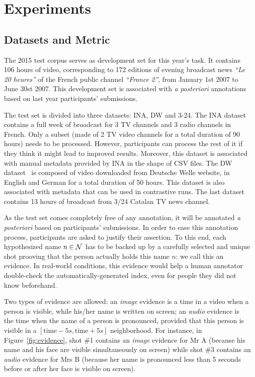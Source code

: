 \section{Experiments}
\label{sec:experiment}
%
\subsection{Datasets and Metric}

The 2015 test corpus serves as development set for this year's task. It contains 106 hours of video, corresponding to 172 editions of evening broadcast news \emph{``Le 20 heures''} of the French public channel \emph{``France 2''}, from January 1st 2007 to June 30st 2007. This development set is associated with \emph{a posteriori} annotations based on last year participants' submissions.

The test set is divided into three datasets: INA, DW and 3-24. The INA dataset contains a full week of broadcast for 3 TV channels and 3 radio channels in French. Only a subset (made of 2 TV video channels for a total duration of 90 hours) needs to be processed. However, participants can process the rest of it if they think it might lead to improved results. Moreover, this dataset is associated with manual metadata provided by INA in the shape of CSV files. The DW dataset~\cite{EUMSSI} is composed of video downloaded from Deutsche Welle website, in English and German for a total duration of 50 hours. This dataset is also associated with metadata that can be used in contrastive runs. The last dataset contains 13 hours of broadcast from 3/24 Catalan TV news channel.

As the test set comes completely free of any annotation, it will be annotated \emph{a posteriori} based on participants' submissions.
In order to ease this annotation process, participants are asked to justify their assertion. To this end, each hypothesized name $n \in \mathcal{N}$ has to be backed up by a carefully selected and unique shot prooving that the person actually holds this name $n$: we call this an evidence. In real-world conditions, this evidence would help a human annotator double-check the automatically-generated index, even for people they did not know beforehand.

Two types of evidence are allowed: an \emph{image} evidence is a time in a video when a person is visible, while his/her name is written on screen; an \emph{audio} evidence is the time when the name of a person is pronounced, provided that this person is visible in a $[\text{time} - 5s, \text{time} + 5s ]$ neighborhood.
For instance, in Figure~\ref{fig:evidence}, shot \#1 contains an \emph{image} evidence for Mr A (because his name and his face are visible simultaneously on screen) while shot \#3 contains an \emph{audio} evidence for Mrs B (because her name is pronounced less than 5 seconds before or after her face is visible on screen).

